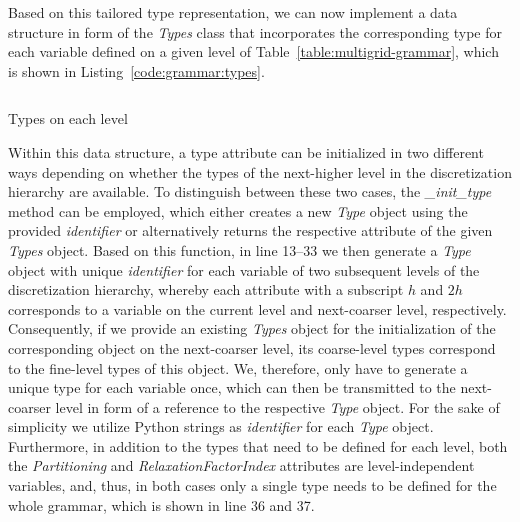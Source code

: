 Based on this tailored type representation, we can now implement a data structure in form of the \emph{Types} class that incorporates the corresponding type for each variable defined on a given level of Table~\ref{table:multigrid-grammar}, which is shown in Listing~\ref{code:grammar:types}.
\begin{listing}
  	\inputminted[linenos]{python}{evostencils/grammar/types.py}
  	\caption{Types on each level}
  	\label{code:grammar:types}
\end{listing}
Within this data structure, a type attribute can be initialized in two different ways depending on whether the types of the next-higher level in the discretization hierarchy are available.
To distinguish between these two cases, the \emph{\_init\_type} method can be employed, which either creates a new \emph{Type} object using the provided \emph{identifier} or alternatively returns the respective attribute of the given \emph{Types} object.
Based on this function, in line 13--33 we then generate a \emph{Type} object with unique \emph{identifier} for each variable of two subsequent levels of the discretization hierarchy, whereby each attribute with a subscript $h$ and $2h$ corresponds to a variable on the current level and next-coarser level, respectively.
Consequently, if we provide an existing \emph{Types} object for the initialization of the corresponding object on the next-coarser level, its coarse-level types correspond to the fine-level types of this object.
We, therefore, only have to generate a unique type for each variable once, which can then be transmitted to the next-coarser level in form of a reference to the respective \emph{Type} object.
For the sake of simplicity we utilize Python strings as \emph{identifier} for each \emph{Type} object. 
Furthermore, in addition to the types that need to be defined for each level, both the \emph{Partitioning} and \emph{RelaxationFactorIndex} attributes are level-independent variables, and, thus, in both cases only a single type needs to be defined for the whole grammar, which is shown in line 36 and 37.

